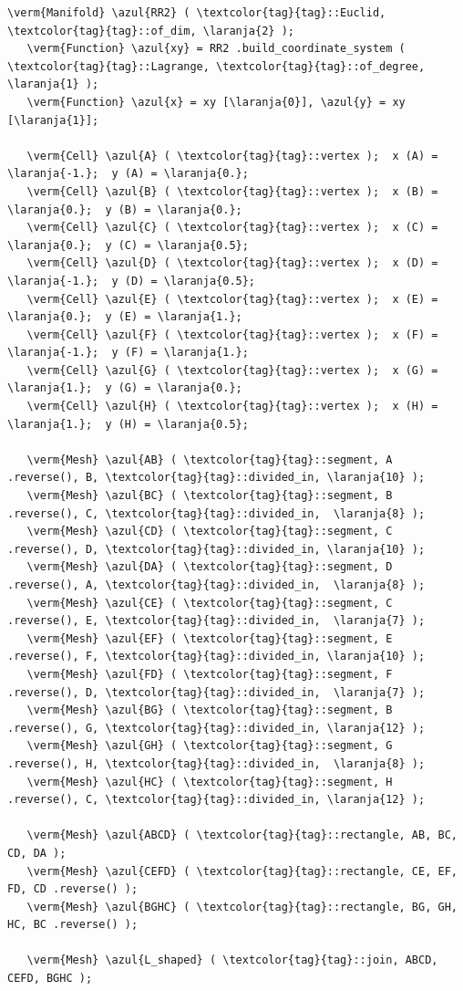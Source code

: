 \begin{Verbatim}[commandchars=\\\{\},formatcom=\small\tt,frame=single,
   label=parag-\ref{\numb section 1.\numb parag 4}.cpp,rulecolor=\color{coment},
   baselinestretch=0.94,framesep=2mm]
   \verm{Manifold} \azul{RR2} ( \textcolor{tag}{tag}::Euclid, \textcolor{tag}{tag}::of_dim, \laranja{2} );
   \verm{Function} \azul{xy} = RR2 .build_coordinate_system ( \textcolor{tag}{tag}::Lagrange, \textcolor{tag}{tag}::of_degree, \laranja{1} );
   \verm{Function} \azul{x} = xy [\laranja{0}], \azul{y} = xy [\laranja{1}];

   \verm{Cell} \azul{A} ( \textcolor{tag}{tag}::vertex );  x (A) = \laranja{-1.};  y (A) = \laranja{0.};
   \verm{Cell} \azul{B} ( \textcolor{tag}{tag}::vertex );  x (B) =  \laranja{0.};  y (B) = \laranja{0.};
   \verm{Cell} \azul{C} ( \textcolor{tag}{tag}::vertex );  x (C) =  \laranja{0.};  y (C) = \laranja{0.5};
   \verm{Cell} \azul{D} ( \textcolor{tag}{tag}::vertex );  x (D) = \laranja{-1.};  y (D) = \laranja{0.5};
   \verm{Cell} \azul{E} ( \textcolor{tag}{tag}::vertex );  x (E) =  \laranja{0.};  y (E) = \laranja{1.};
   \verm{Cell} \azul{F} ( \textcolor{tag}{tag}::vertex );  x (F) = \laranja{-1.};  y (F) = \laranja{1.};
   \verm{Cell} \azul{G} ( \textcolor{tag}{tag}::vertex );  x (G) =  \laranja{1.};  y (G) = \laranja{0.};
   \verm{Cell} \azul{H} ( \textcolor{tag}{tag}::vertex );  x (H) =  \laranja{1.};  y (H) = \laranja{0.5};

   \verm{Mesh} \azul{AB} ( \textcolor{tag}{tag}::segment, A .reverse(), B, \textcolor{tag}{tag}::divided_in, \laranja{10} );
   \verm{Mesh} \azul{BC} ( \textcolor{tag}{tag}::segment, B .reverse(), C, \textcolor{tag}{tag}::divided_in,  \laranja{8} );
   \verm{Mesh} \azul{CD} ( \textcolor{tag}{tag}::segment, C .reverse(), D, \textcolor{tag}{tag}::divided_in, \laranja{10} );
   \verm{Mesh} \azul{DA} ( \textcolor{tag}{tag}::segment, D .reverse(), A, \textcolor{tag}{tag}::divided_in,  \laranja{8} );
   \verm{Mesh} \azul{CE} ( \textcolor{tag}{tag}::segment, C .reverse(), E, \textcolor{tag}{tag}::divided_in,  \laranja{7} );
   \verm{Mesh} \azul{EF} ( \textcolor{tag}{tag}::segment, E .reverse(), F, \textcolor{tag}{tag}::divided_in, \laranja{10} );
   \verm{Mesh} \azul{FD} ( \textcolor{tag}{tag}::segment, F .reverse(), D, \textcolor{tag}{tag}::divided_in,  \laranja{7} );
   \verm{Mesh} \azul{BG} ( \textcolor{tag}{tag}::segment, B .reverse(), G, \textcolor{tag}{tag}::divided_in, \laranja{12} );
   \verm{Mesh} \azul{GH} ( \textcolor{tag}{tag}::segment, G .reverse(), H, \textcolor{tag}{tag}::divided_in,  \laranja{8} );
   \verm{Mesh} \azul{HC} ( \textcolor{tag}{tag}::segment, H .reverse(), C, \textcolor{tag}{tag}::divided_in, \laranja{12} );

   \verm{Mesh} \azul{ABCD} ( \textcolor{tag}{tag}::rectangle, AB, BC, CD, DA );
   \verm{Mesh} \azul{CEFD} ( \textcolor{tag}{tag}::rectangle, CE, EF, FD, CD .reverse() );
   \verm{Mesh} \azul{BGHC} ( \textcolor{tag}{tag}::rectangle, BG, GH, HC, BC .reverse() );

   \verm{Mesh} \azul{L_shaped} ( \textcolor{tag}{tag}::join, ABCD, CEFD, BGHC );
\end{Verbatim}

